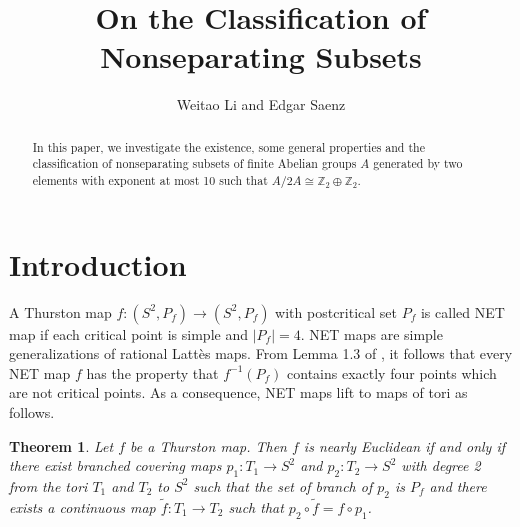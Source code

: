 \documentclass[article,dvisp]{amsart}
\def\Z{\mathbb{Z}}
\newtheorem{thm}{Theorem}[section]
\theoremstyle{definition}
\theoremstyle{remark}
\numberwithin{equation}{section}
\theoremstyle{lemma}
\begin{document}
\title[On the Classification of Nonseparating Substes]{On the Classification of Nonseparating Subsets}
\author[Weitao Li and Edgar Saenz]{Weitao Li and Edgar Saenz}
\address{Department of Mathematics,
Virginia Tech,
Blacksburg, VA 24061, U.S.A.}
\address{Department of Mathematics,
Virginia Tech,
Blacksburg, VA 24061, U.S.A.}
\begin{abstract} 
In this paper, we investigate the existence, some general properties and the classification of nonseparating subsets of finite Abelian groups $A$ generated by two elements with exponent at most 10 such that $A/2A\cong \Z_{2}\oplus\Z_{2}$.\end{abstract}
\maketitle
\section{Introduction}
A Thurston map $f:(S^{2},P_{f})\to(S^{2},P_{f})$ with postcritical set $P_{f}$ is called NET map if each critical point is simple and $|P_{f}|=4$. NET maps are simple generalizations of rational Latt\`{e}s maps. From Lemma 1.3 of \cite{CFPP}, it follows that every NET map $f$ has the property that $f^{-1}(P_{f})$ contains exactly four points which are not critical points. As a consequence, NET maps lift to maps of tori as follows.
\begin{thm}\label{teo:31} Let $f$ be a Thurston map. Then $f$ is nearly Euclidean if and only if there exist branched covering maps $p_{1}:T_{1}\to S^2$ and $p_{2}:T_{2}\to S^2$ with degree 2 from the tori $T_{1}$ and $T_{2}$ to $S^2$ such that the set of branch of $p_{2} $ is $P_{f}$ and there exists a continuous map $\tilde{f}: T_{1}\to T_{2}$ such that $p_{2}\circ\tilde{f}=f\circ p_{1}$.\end{thm}
\end{document}
